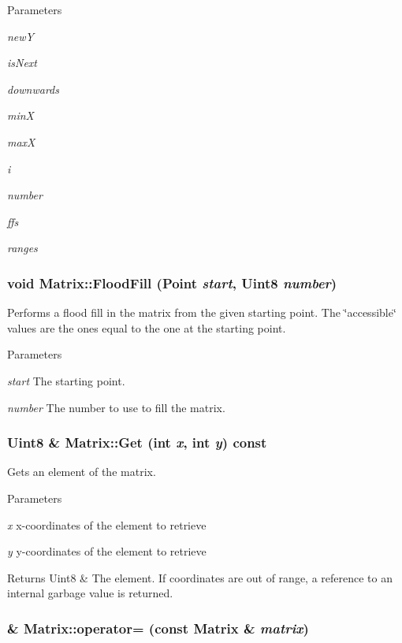 \begin{DoxyParams}{Parameters}
\item[{\em newY}]\item[{\em isNext}]\item[{\em downwards}]\item[{\em minX}]\item[{\em maxX}]\item[{\em i}]\item[{\em number}]\item[{\em ffs}]\item[{\em ranges}]\end{DoxyParams}
\hypertarget{classMatrix_a7209ed0123ff3686f0d0f7f4e6ac7094}{
\subsubsection[{FloodFill}]{\setlength{\rightskip}{0pt plus 5cm}void Matrix::FloodFill ({\bf Point} {\em start}, \/  Uint8 {\em number})}}
\label{classMatrix_a7209ed0123ff3686f0d0f7f4e6ac7094}


Performs a flood fill in the matrix from the given starting point. The \char`\"{}accessible\char`\"{} values are the ones equal to the one at the starting point. 


\begin{DoxyParams}{Parameters}
\item[{\em start}]The starting point. \item[{\em number}]The number to use to fill the matrix. \end{DoxyParams}
\hypertarget{classMatrix_a06fc8df480cd88daf69eaa05867cb7bd}{
\subsubsection[{Get}]{\setlength{\rightskip}{0pt plus 5cm}Uint8 \& Matrix::Get (int {\em x}, \/  int {\em y}) const}}
\label{classMatrix_a06fc8df480cd88daf69eaa05867cb7bd}


Gets an element of the matrix. 


\begin{DoxyParams}{Parameters}
\item[{\em x}]x-\/coordinates of the element to retrieve \item[{\em y}]y-\/coordinates of the element to retrieve \end{DoxyParams}
\begin{DoxyReturn}{Returns}
Uint8 \& The element. If coordinates are out of range, a reference to an internal garbage value is returned. 
\end{DoxyReturn}
\hypertarget{classMatrix_a45e4814b752129bed1f1316632f8543a}{
\subsubsection[{operator=}]{ \& Matrix::operator= (const {\bf Matrix} \& {\em matrix})}}
\label{classMatrix_a45e4814b752129bed1f1316632f8543a}


